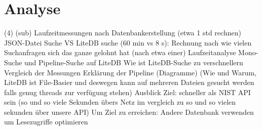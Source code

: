 \section{Analyse} \label{sec:Analyse}
    (4)
    (sub)
    Laufzeitmessungen nach Datenbankerstellung (etwa 1 std rechnen)
        JSON-Datei Suche VS LiteDB suche (60 min vs 8 s): Rechnung nach wie vielen Suchanfragen sich das ganze gelohnt hat (nach etwa einer)
    Laufzeitanalyse Mono-Suche und Pipeline-Suche auf LiteDB
        Wie ist LiteDB-Suche zu verschnellern
        Vergleich der Messungen
        Erklärung der Pipeline (Diagramme) (Wie und Warum, LiteDB ist File-Basier und deswegen kann auf mehreren Dateien gesucht werden falls genug threads zur verfügung stehen)
    Ausblick
        Ziel: schneller als NIST API sein (so und so viele Sekunden übers Netz im vergleich zu so und so vielen sekunden über unsere API)
        Um Ziel zu erreichen: Andere Datenbank verwenden um Lesezugriffe optimieren
